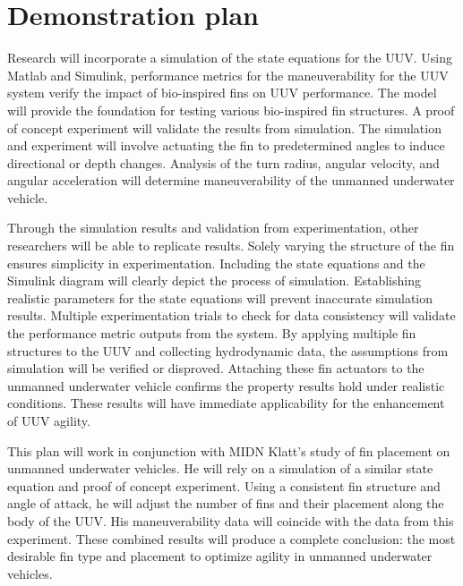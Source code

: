 \documentclass[]{IEEEtran}
\begin{document}
\section{Demonstration plan}
Research will incorporate a simulation of the state equations for the UUV.  Using Matlab and Simulink, performance metrics for the maneuverability for the UUV system verify the impact of bio-inspired fins on UUV performance. The model will provide the foundation for testing various bio-inspired fin structures.  A proof of concept experiment will validate the results from simulation.  The simulation and experiment will involve actuating the fin to predetermined angles to induce directional or depth changes.  Analysis of the turn radius, angular velocity, and angular acceleration will determine maneuverability of the unmanned underwater vehicle.  

Through the simulation results and validation from experimentation, other researchers will be able to replicate results.  Solely varying the structure of the fin ensures simplicity in experimentation.  Including the state equations and the Simulink diagram will clearly depict the process of simulation.  Establishing realistic parameters for the state equations will prevent inaccurate simulation results.  Multiple experimentation trials to check for data consistency will validate the performance metric outputs from the system.  By applying multiple fin structures to the UUV and collecting hydrodynamic data, the assumptions from simulation will be verified or disproved.  Attaching these fin actuators to the unmanned underwater vehicle confirms the property results hold under realistic conditions.  These results will have immediate applicability for the enhancement of UUV agility.  

This plan will work in conjunction with MIDN Klatt’s study of fin placement on unmanned underwater vehicles.  He will rely on a simulation of a similar state equation and proof of concept experiment.  Using a consistent fin structure and angle of attack, he will adjust the number of fins and their placement along the body of the UUV.  His maneuverability data will coincide with the data from this experiment.  These combined results will produce a complete conclusion: the most desirable fin type and placement to optimize agility in unmanned underwater vehicles.
\end{document}

